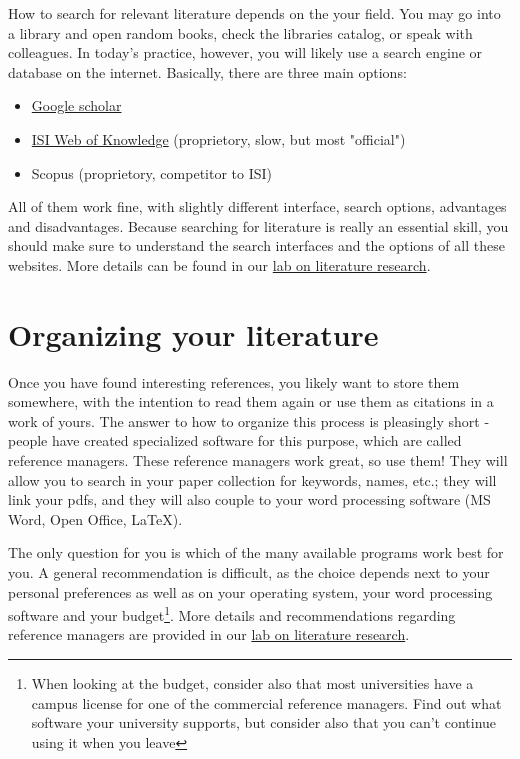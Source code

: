 \documentclass{tufte-book}
\begin{document}
How to search for relevant literature depends on the your field. You may go into a library and open random books, check the libraries catalog, or speak with colleagues. In today's practice, however, you will likely use a search engine or database on the internet. Basically, there are three main options:

\begin{itemize}
\item \href{https://scholar.google.de/}{Google scholar}
\item \href{http://webofknowledge.com/}{ISI Web of Knowledge} (proprietory, slow, but most "official")
\item Scopus (proprietory, competitor to ISI)
\end{itemize}

All  of them work fine, with slightly different interface, search options, advantages and disadvantages. Because searching for literature is really an essential skill, you should make sure to understand the search interfaces and the options of all these websites. More details can be found in our \href{https://github.com/florianhartig/ResearchSkills/tree/master/Labs/LiteratureResearch}{lab on literature research}.

\section{Organizing your literature}

Once you have found interesting references, you likely want to store them somewhere, with the intention to read them again or use them as citations in a work of yours. The answer to how to organize this process is pleasingly short - people have created specialized software for this purpose, which are called reference managers. These reference managers work great, so use them! They will allow you to search in your paper collection for keywords, names, etc.; they will link your pdfs, and they will also couple to your word processing software (MS Word, Open Office, LaTeX).


The only question for you is which of the many available programs work best for you. A general recommendation is difficult, as the choice depends next to your personal preferences as well as on your operating system, your word processing software and your budget\footnote{When looking at the budget, consider also that most universities have a campus license for one of the commercial reference managers. Find out what software your university supports, but consider also that you can't continue using it when you leave}. More details and recommendations regarding reference managers are provided in our \href{https://github.com/florianhartig/ResearchSkills/tree/master/Labs/LiteratureResearch}{lab on literature research}.
\end{document}

